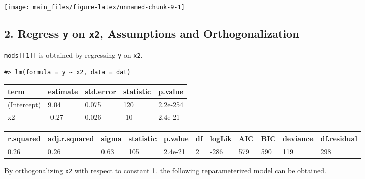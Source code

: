 \documentclass[a4paper]{article}
\newenvironment{Shaded}{\begin{snugshade}}{\end{snugshade}}
\newcommand{\DataTypeTok}[1]{\textcolor[rgb]{0.13,0.29,0.53}{#1}}
\newcommand{\DecValTok}[1]{\textcolor[rgb]{0.00,0.00,0.81}{#1}}
\newcommand{\KeywordTok}[1]{\textcolor[rgb]{0.13,0.29,0.53}{\textbf{#1}}}
\newcommand{\NormalTok}[1]{#1}
\newcommand{\OperatorTok}[1]{\textcolor[rgb]{0.81,0.36,0.00}{\textbf{#1}}}
\newcommand{\StringTok}[1]{\textcolor[rgb]{0.31,0.60,0.02}{#1}}
\begin{document}
\begin{center}\texttt{[image: main\_files/figure-latex/unnamed-chunk-9-1]} \end{center}

\hypertarget{regress-y-on-x2-assumptions-and-orthogonalization}{%
\subsection{\texorpdfstring{2. Regress \texttt{y} on \texttt{x2},
Assumptions and
Orthogonalization}{2. Regress y on x2, Assumptions and Orthogonalization}}\label{regress-y-on-x2-assumptions-and-orthogonalization}}

\texttt{mods{[}{[}1{]}{]}} is obtained by regressing \texttt{y} on
\texttt{x2}.

\begin{verbatim}
#> lm(formula = y ~ x2, data = dat)
\end{verbatim}

\begin{table}[H]
\centering
\begin{tabular}{lllll}
\toprule
term & estimate & std.error & statistic & p.value\\
\midrule
(Intercept) & 9.04 & 0.075 & 120 & 2.2e-254\\
x2 & -0.27 & 0.026 & -10 & 2.4e-21\\
\bottomrule
\end{tabular}
\end{table}

\begin{table}[H]
\centering
\begin{tabular}{lllllllllll}
\toprule
r.squared & adj.r.squared & sigma & statistic & p.value & df & logLik & AIC & BIC & deviance & df.residual\\
\midrule
0.26 & 0.26 & 0.63 & 105 & 2.4e-21 & 2 & -286 & 579 & 590 & 119 & 298\\
\bottomrule
\end{tabular}
\end{table}

By orthogonalizing \texttt{x2} with respect to constant 1. the following
reparameterized model can be obtained.

\begin{Shaded}
\end{Shaded}
\end{document}
